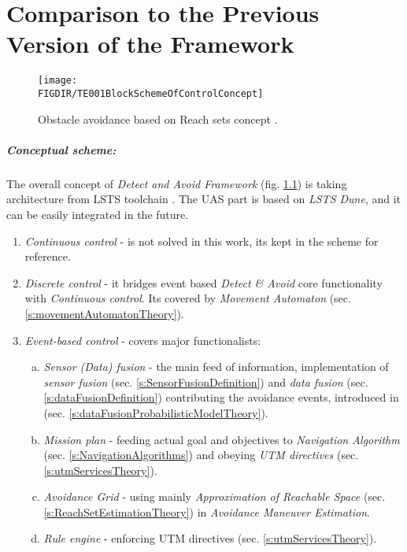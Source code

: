 \cleardoublepage

\chapter{Comparison to the Previous Version of the Framework}
\begin{figure}[H]
    \centering
    \texttt{[image: \\FIGDIR/TE001BlockSchemeOfControlConcept]} 
    \caption{Obstacle avoidance based on Reach sets concept \cite{gomola2017obstacle}.}
    \label{fig:avoidanceConcept}
\end{figure}

\paragraph{Conceptual scheme:} The overall concept of \emph{Detect and Avoid Framework} (fig. \ref{fig:avoidanceConcept}) is taking architecture from LSTS toolchain \cite{pinto2013lsts,pinto2012implementation}. The UAS part is based on \emph{LSTS Dune}, and it can be easily integrated in the future. 

\begin{enumerate}
    \item \emph{Continuous control} - is not solved in this work, its kept in the scheme for reference. 
    
    \item \emph{Discrete control} - it bridges event based \emph{Detect \& Avoid} core functionality with \emph{Continuous control}. Its covered by \emph{Movement Automaton} (sec. \ref{s:movementAutomatonTheory}).

   \newpage
    \item \emph{Event-based control} - covers major functionalists:    
    \begin{enumerate}[a.]
        \item \emph{Sensor (Data) fusion} - the main feed of information, implementation of \emph{sensor fusion} (sec. \ref{s:SensorFusionDefinition}) and \emph{data fusion} (sec. \ref{s:dataFusionDefinition}) contributing the avoidance events, introduced in (sec. \ref{s:dataFusionProbabilisticModelTheory}).
        
        \item \emph{Mission plan} - feeding actual goal and objectives to \emph{Navigation Algorithm} (sec. \ref{s:NavigationAlgorithms}) and obeying \emph{UTM directives} (sec. \ref{s:utmServicesTheory}).
        
        \item \emph{Avoidance Grid}  - using mainly \emph{Approximation of Reachable Space} (sec. \ref{s:ReachSetEstimationTheory}) in \emph{Avoidance Maneuver Estimation}.
        
        \item \emph{Rule engine} - enforcing UTM directives (sec. \ref{s:utmServicesTheory}).
    \end{enumerate}
    
\end{enumerate}

